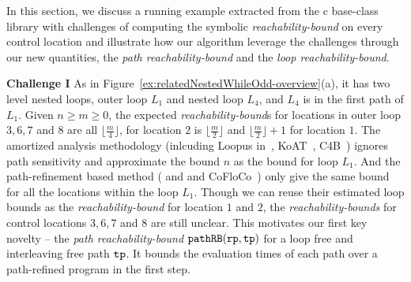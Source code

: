 In this section, we discuss a running example extracted from the c base-class library with
challenges of computing the symbolic
\emph{reachability-bound} on
every control location and illustrate how our algorithm leverage the challenges through our new quantities, the \emph{path reachability-bound} and the \emph{loop reachability-bound}.


\textbf{Challenge I}
As in Figure~\ref{ex:relatedNestedWhileOdd-overview}(a), it has two level nested loops, outer loop $L_1$ and nested loop $L_4$, and $L_4$ is in the first path of $L_1$. Given $n \geq m \geq 0$,
the expected \emph{reachability-bound}s for locations in outer loop $3, 6, 7$ and $8$ are all $\lfloor\frac{m}{4}\rfloor$,
for location $2$ is $\lfloor\frac{m}{2}\rfloor$ and $\lfloor\frac{m}{2}\rfloor + 1$ for location $1$.
The amortized analysis methodology (inlcuding Loopus in~\cite{SinnZV17}, KoAT~\cite{BrockschmidtEFFG14,FalkeKS12,FalkeKS11}, C4B~\cite{CarbonneauxHS15}) ignores path sensitivity and approximate the bound $n$ as the bound for loop $L_1$. 
And the path-refinement based method (\cite{GulwaniZ10} and \cite{GulwaniJK09} and CoFloCo~\cite{Montoya17,Flores-Montoya16,Flores-MontoyaH14}) only give the same bound for all the locations within the loop $L_1$. 
Though we can reuse their estimated loop bounds as the \emph{reachability-bound} for location $1$ and $2$,
the \emph{reachability-bounds} for control locations $3, 6, 7$ and $8$ are still unclear.
%
This motivates our first key novelty -- the \emph{path reachability-bound} $\mathtt{pathRB}(\mathtt{rp}, \mathtt{tp})$ for a loop free and interleaving free path $\mathtt{tp}$.
It bounds the evaluation times of each path over a path-refined program in the first step.


